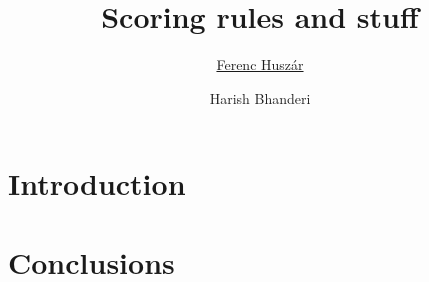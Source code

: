 \documentclass[11pt]{CUEDthesisPSnPDF}
\title{Scoring rules and stuff}
\author{\href{mailto:ferenc.huszar@gmail.com}{Ferenc Husz\'{a}r}}
\author{Harish Bhanderi}
\begin{document}
\maketitle

\setcounter{secnumdepth}{2}
\setcounter{tocdepth}{2}

\frontmatter
{}




\tableofcontents
\listoffigures
\mainmatter

\ChapterOutsidePart

\chapter{Introduction}



\ChapterInsidePart







\ChapterOutsidePart

\chapter{Conclusions}




\renewcommand{\bibname}{References}

\end{document}
